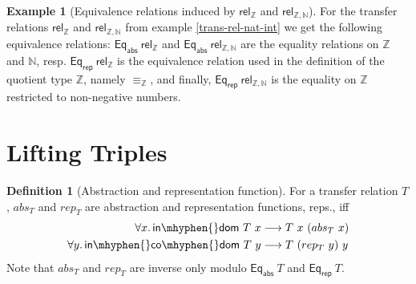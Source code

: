 \documentclass[]{article}
\theoremstyle{definition}
\newtheorem{definition}{Definition}[section]
\newtheorem{example}{Example}[section]
\newcommand{\indom}{\mathsf{in\mhyphen{}dom}}
\newcommand{\incodom}{\mathsf{in\mhyphen{}co\mhyphen{}dom}}
\newcommand{\eqrep}{\mathsf{Eq_{rep}}}
\newcommand{\eqabs}{\mathsf{Eq_{abs}}}
\newcommand{\nat}{\mathbb{N}}
\newcommand{\inte}{\mathbb{Z}}
\newcommand{\relint}{\mathsf{rel_\inte}}
\newcommand{\relintnat}{\mathsf{rel_{\inte, \nat}}}
\begin{document}
\begin{example}[Equivalence relations induced by \(\relint\) and \(\relintnat\)]
	For the transfer relations \(\relint\) and \(\relintnat\) from example \ref{trans-rel-nat-int} we get the following equivalence relations: \(\eqabs\ \relint\) and \(\eqabs\ \relintnat\) are the equality relations on \(\inte\) and \(\nat\), resp. \(\eqrep\ \relint\) is the equivalence relation used in the definition of the quotient type \(\inte\), namely \(\equiv_\inte\), and finally, \(\eqrep\ \relintnat\) is the equality on \(\inte\) restricted to non-negative numbers.
\end{example}

\section{Lifting Triples}

\begin{definition}[Abstraction and representation function]
	For a transfer relation \(T\), \(abs_T\) and \(rep_T\) are abstraction and representation functions, reps., iff
	\begin{align}
		\forall x\ldotp \indom\ T\ x &\longrightarrow T\ x\ (abs_T\ x) \label{abs-def} \\
		\forall y\ldotp \incodom\ T\ y &\longrightarrow T\ (rep_T\ y)\ y \label{rep-def}
	\end{align}
	Note that \(abs_T\) and \(rep_T\) are inverse only modulo \(\eqabs\ T\) and \(\eqrep\ T\).
\end{definition}
\end{document}
